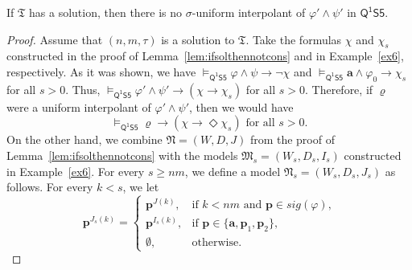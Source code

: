 \documentclass{lmcs} %
\theoremstyle{plain}\newtheorem{satz}[thm]{Satz} %
\newcommand{\sig}{\mathit{sig}}
\newcommand{\tiling}{\mathfrak T}
\newcommand{\FOMS}{\ensuremath{\mathsf{Q^1S5}}}
\newcommand{\fform}[1]{\boldsymbol{#1}}
\newcommand{\pvar}{\fform{p}}
\newcommand{\avar}{\fform{a}}
\newcommand{\gvar}{\fform{g}}
\newcommand{\tvar}{\fform{t}}
\newcommand{\xvar}{\fform{x}}
\newcommand{\yvar}{\fform{y}}
\begin{document}
		\begin{lem}
			If $\tiling$ has a solution, then there is no $\sigma$-uniform interpolant of $\varphi'\wedge \psi'$ in $\FOMS$.
		\end{lem}
		\begin{proof}
			Assume that $(n,m,\tau)$ is a solution to $\tiling$.
			Take the formulas $\chi$ and $\chi_{s}$ constructed in the proof of Lemma~\ref{lem:ifsolthennotcons} and in Example~\ref{ex6}, respectively. As it was shown, we have $\models_\FOMS\varphi\land\psi\to\neg\chi$ and 
			$\models_\FOMS\avar\land\varphi_0\to\chi_s$ for all $s>0$. Thus, 
			$\models_\FOMS \varphi' \wedge \psi' \rightarrow (\chi \rightarrow \chi_{s})$ for all $s>0$. 
			Therefore, if $\varrho$ were a uniform interpolant of $\varphi'\land\psi'$, then we would have 
			\begin{equation}
				\label{follows}
				\models_\FOMS\varrho\to(\chi \rightarrow \Diamond\chi_{s})\mbox{ for all $s>0$}.
			\end{equation}
			On the other hand, we combine $\mathfrak{N}=(W,D,J)$ from the proof of Lemma~\ref{lem:ifsolthennotcons} with the models $\mathfrak{M}_{s}=(W_{s},D_{s},I_{s})$ constructed in Example~\ref{ex6}.
			For every $s\geq nm$, we define a model $\mathfrak{N}_{s}=(W_{s},D_{s},J_{s})$ as follows. For every $k<s$, we let	
			\[
			\pvar^{J_s(k)} = \left\{
			\begin{array}{ll}
				\pvar^{J(k)},  & \mbox{if $k<nm$ and $\pvar\in\sig(\varphi)$,}\\[3pt]
				\pvar^{I_s(k)},  & \mbox{if $\pvar\in\{\avar,\pvar_1,\pvar_2\}$,}\\[3pt]
				\emptyset, &\mbox{otherwise.}
			\end{array}
			\right.
			\]

\end{proof}
\end{document}
